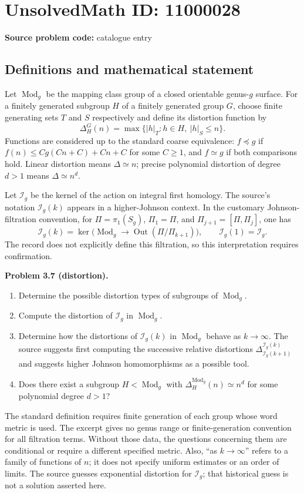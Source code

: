 \documentclass[11pt]{article}
\begin{document}
\section*{UnsolvedMath ID: 11000028}
\textbf{Source problem code:} catalogue entry
\subsection{Definitions and mathematical statement}
Let $\operatorname{Mod}_g$ be the mapping class group of a closed orientable genus-$g$ surface. For a finitely generated subgroup $H$ of a finitely generated group $G$, choose finite generating sets $T$ and $S$ respectively and define its distortion function by
\[
 \Delta_H^G(n)=\max\{|h|_T:h\in H,\ |h|_S\le n\}.
\]
Functions are considered up to the standard coarse equivalence: $f\preceq g$ if $f(n)\le Cg(Cn+C)+Cn+C$ for some $C\ge1$, and $f\simeq g$ if both comparisons hold. Linear distortion means $\Delta\simeq n$; precise polynomial distortion of degree $d>1$ means $\Delta\simeq n^d$.

Let $\mathcal I_g$ be the kernel of the action on integral first homology. The source's notation $\mathcal I_g(k)$ appears in a higher-Johnson context. In the customary Johnson-filtration convention, for $\Pi=\pi_1(S_g)$, $\Pi_1=\Pi$, and $\Pi_{j+1}=[\Pi,\Pi_j]$, one has
\[
 \mathcal I_g(k)=\ker\bigl(\operatorname{Mod}_g\to\operatorname{Out}(\Pi/\Pi_{k+1})\bigr),\qquad \mathcal I_g(1)=\mathcal I_g.
\]
The record does not explicitly define this filtration, so this interpretation requires confirmation.

\textbf{Problem 3.7 (distortion).}
\begin{enumerate}
\item Determine the possible distortion types of subgroups of $\operatorname{Mod}_g$.
\item Compute the distortion of $\mathcal I_g$ in $\operatorname{Mod}_g$.
\item Determine how the distortions of $\mathcal I_g(k)$ in $\operatorname{Mod}_g$ behave as $k\to\infty$. The source suggests first computing the successive relative distortions $\Delta_{\mathcal I_g(k+1)}^{\mathcal I_g(k)}$ and suggests higher Johnson homomorphisms as a possible tool.
\item Does there exist a subgroup $H<\operatorname{Mod}_g$ with $\Delta_H^{\operatorname{Mod}_g}(n)\simeq n^d$ for some polynomial degree $d>1$?
\end{enumerate}
The standard definition requires finite generation of each group whose word metric is used. The excerpt gives no genus range or finite-generation convention for all filtration terms. Without those data, the questions concerning them are conditional or require a different specified metric. Also, ``as $k\to\infty$'' refers to a family of functions of $n$; it does not specify uniform estimates or an order of limits. The source guesses exponential distortion for $\mathcal I_g$; that historical guess is not a solution asserted here.
\end{document}
